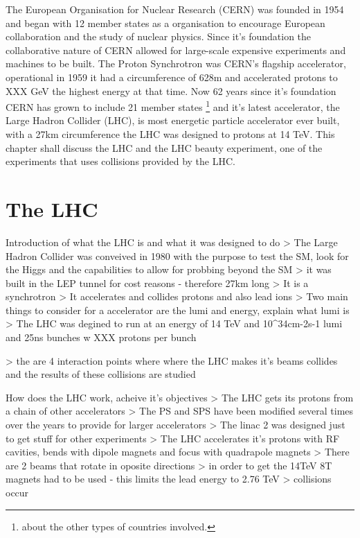 The European Organisation for Nuclear Research (CERN) was founded in 1954 and began with 12 member states as a organisation to encourage European collaboration and the study of nuclear physics. Since it's foundation the collaborative nature of CERN allowed for large-scale expensive experiments and machines to be built. The Proton Synchrotron was CERN's flagship accelerator, operational in 1959 it had a circumference of 628m and accelerated protons to XXX GeV the highest energy at that time. Now 62 years since it's foundation CERN has grown to include 21 member states \footnote{about the other types of countries involved.} and it’s latest accelerator, the Large Hadron Collider (LHC), is most energetic particle accelerator ever built, with a 27km circumference the LHC was designed to protons at 14 TeV.
This chapter shall discuss the LHC and the LHC beauty experiment, one of the experiments that uses collisions provided by the LHC.



\section{The LHC}

Introduction of what the LHC is and what it was designed to do
> The Large Hadron Collider was conveived in 1980 with the purpose to test the SM, look for the Higgs and the capabilities to allow for probbing beyond the SM
> it was built in the LEP tunnel for cost reasons - therefore 27km long
> It is a synchrotron
> It accelerates and collides protons and also lead ions
> Two main things to consider for a accelerator are the lumi and energy, explain what lumi is
> The LHC was degined to run at an energy of 14 TeV and 10^34cm-2s-1 lumi and 25ns bunches w XXX protons per bunch

> the are 4 interaction points where where the LHC makes it's beams collides and the results of these collisions are studied


How does the LHC work, acheive it's objectives
> The LHC gets its protons from a chain of other accelerators
> The PS and SPS have been modified several times over the years to provide for larger accelerators
> The linac 2 was designed just to get stuff for other experiments
> The LHC accelerates it's protons with RF cavities, bends with dipole magnets and focus with quadrapole magnets
> There are 2 beams that rotate in oposite directions
> in order to get the 14TeV 8T magnets had to be used - this limits the lead energy to 2.76 TeV
> collisions occur


